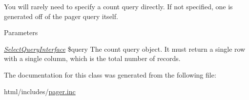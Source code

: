 You will rarely need to specify a count query directly. If not specified, one is generated off of the pager query itself.


\begin{DoxyParams}{Parameters}
\item[{\em \hyperlink{interfaceSelectQueryInterface}{SelectQueryInterface}}]\$query The count query object. It must return a single row with a single column, which is the total number of records. \end{DoxyParams}


The documentation for this class was generated from the following file:\begin{DoxyCompactItemize}
\item 
html/includes/\hyperlink{pager_8inc}{pager.inc}\end{DoxyCompactItemize}
